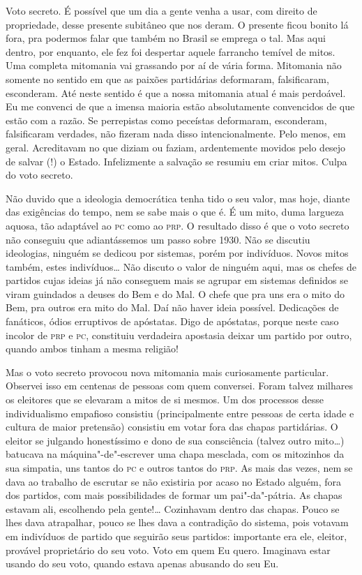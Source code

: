 Voto secreto. É possível que um dia a gente venha a usar, com direito de
propriedade, desse presente subitâneo que nos deram. O presente ficou
bonito lá fora, pra podermos falar que também no Brasil se emprega o
tal. Mas aqui dentro, por enquanto, ele fez foi despertar aquele
farrancho temível de mitos. Uma completa mitomania vai grassando por aí
de vária forma. Mitomania não somente no sentido em que as paixões
partidárias deformaram, falsificaram, esconderam. Até neste sentido é
que a nossa mitomania atual é mais perdoável. Eu me convenci de que a
imensa maioria estão absolutamente convencidos de que estão com a razão.
Se perrepistas como peceístas deformaram, esconderam, falsificaram
verdades, não fizeram nada disso intencionalmente. Pelo menos, em geral.
Acreditavam no que diziam ou faziam, ardentemente movidos pelo desejo de
salvar (!) o Estado. Infelizmente a salvação se resumiu em criar mitos.
Culpa do voto secreto.

Não duvido que a ideologia democrática tenha tido o seu valor, mas hoje,
diante das exigências do tempo, nem se sabe mais o que é. É um mito,
duma largueza aquosa, tão adaptável ao \textsc{pc} como ao \textsc{prp}. O resultado disso
é que o voto secreto não conseguiu que adiantássemos um passo sobre
1930. Não se discutiu ideologias, ninguém se dedicou por sistemas, porém
por indivíduos. Novos mitos também, estes indivíduos\ldots{} Não discuto o
valor de ninguém aqui, mas os chefes de partidos cujas ideias já não
conseguem mais se agrupar em sistemas definidos se viram guindados a
deuses do Bem e do Mal. O chefe que pra uns era o mito do Bem, pra
outros era mito do Mal. Daí não haver ideia possível. Dedicações de
fanáticos, ódios erruptivos de apóstatas. Digo de apóstatas, porque
neste caso incolor de \textsc{prp} e \textsc{pc}, constituiu verdadeira apostasia deixar
um partido por outro, quando ambos tinham a mesma religião!

Mas o voto secreto provocou nova mitomania mais curiosamente particular.
Observei isso em centenas de pessoas com quem conversei. Foram talvez
milhares os eleitores que se elevaram a mitos de si mesmos. Um dos
processos desse individualismo empafioso consistiu (principalmente entre
pessoas de certa idade e cultura de maior pretensão) consistiu em votar
fora das chapas partidárias. O eleitor se julgando honestíssimo e dono
de sua consciência (talvez outro mito\ldots{}) batucava na
máquina"-de"-escrever uma chapa mesclada, com os mitozinhos da sua
simpatia, uns tantos do \textsc{pc} e outros tantos do \textsc{prp}. As mais das vezes,
nem se dava ao trabalho de escrutar se não existiria por acaso no Estado
alguém, fora dos partidos, com mais possibilidades de formar um
pai"-da"-pátria. As chapas estavam ali, escolhendo pela gente!\ldots{}
Cozinhavam dentro das chapas. Pouco se lhes dava atrapalhar, pouco se
lhes dava a contradição do sistema, pois votavam em indivíduos de
partido que seguirão seus partidos: importante era ele, eleitor,
provável proprietário do seu voto. Voto em quem Eu quero. Imaginava
estar usando do seu voto, quando estava apenas abusando do seu Eu.

